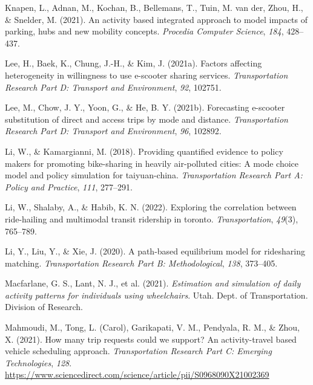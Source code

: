 \documentclass[simple, masters, twoside]{byuthesis}
\newlength{\cslhangindent}
\newlength{\cslentryspacingunit} %
\newenvironment{CSLReferences}[2] %
 {%
  \setlength{\parindent}{0pt}
  \ifodd #1
  \let\oldpar\par
  \def\par{\hangindent=\cslhangindent\oldpar}
  \fi
  \setlength{\parskip}{#2\cslentryspacingunit}
 }%
 {}
\begin{document}
\begin{CSLReferences}{1}{0}
\leavevmode{}%
Knapen, L., Adnan, M., Kochan, B., Bellemans, T., Tuin, M. van der, Zhou, H., \& Snelder, M. (2021). An activity based integrated approach to model impacts of parking, hubs and new mobility concepts. \emph{Procedia Computer Science}, \emph{184}, 428--437.

\leavevmode{}%
Lee, H., Baek, K., Chung, J.-H., \& Kim, J. (2021a). Factors affecting heterogeneity in willingness to use e-scooter sharing services. \emph{Transportation Research Part D: Transport and Environment}, \emph{92}, 102751.

\leavevmode{}%
Lee, M., Chow, J. Y., Yoon, G., \& He, B. Y. (2021b). Forecasting e-scooter substitution of direct and access trips by mode and distance. \emph{Transportation Research Part D: Transport and Environment}, \emph{96}, 102892.

\leavevmode{}%
Li, W., \& Kamargianni, M. (2018). Providing quantified evidence to policy makers for promoting bike-sharing in heavily air-polluted cities: A mode choice model and policy simulation for taiyuan-china. \emph{Transportation Research Part A: Policy and Practice}, \emph{111}, 277--291.

\leavevmode{}%
Li, W., Shalaby, A., \& Habib, K. N. (2022). Exploring the correlation between ride-hailing and multimodal transit ridership in toronto. \emph{Transportation}, \emph{49}(3), 765--789.

\leavevmode{}%
Li, Y., Liu, Y., \& Xie, J. (2020). A path-based equilibrium model for ridesharing matching. \emph{Transportation Research Part B: Methodological}, \emph{138}, 373--405.

\leavevmode{}%
Macfarlane, G. S., Lant, N. J., et al. (2021). \emph{Estimation and simulation of daily activity patterns for individuals using wheelchairs}. Utah. Dept. of Transportation. Division of Research.

\leavevmode{}%
Mahmoudi, M., Tong, L. (Carol), Garikapati, V. M., Pendyala, R. M., \& Zhou, X. (2021). How many trip requests could we support? An activity-travel based vehicle scheduling approach. \emph{Transportation Research Part C: Emerging Technologies}, \emph{128}. \url{https://www.sciencedirect.com/science/article/pii/S0968090X21002369}


\end{CSLReferences}
\end{document}
